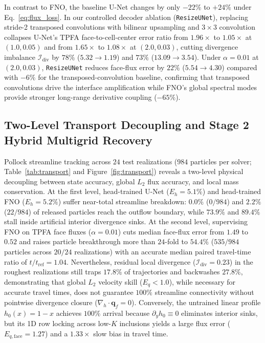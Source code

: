 \documentclass[preprint,12pt,authoryear]{elsarticle}
\begin{document}
In contrast to FNO, the baseline U-Net changes by only $-22\%$ to $+24\%$ under Eq.~\eqref{eq:flux_loss}. In our controlled decoder ablation (\texttt{ResizeUNet}), replacing stride-2 transposed convolutions with bilinear upsampling and $3 \times 3$ convolution collapses U-Net's TPFA face-to-cell-center error ratio from $1.96\times$ to $1.05\times$ at $(1.0, 0.05)$ and from $1.65\times$ to $1.08\times$ at $(2.0, 0.03)$, cutting divergence imbalance $\mathcal{I}_{\text{div}}$ by $78\%$ ($5.32 \to 1.19$) and $73\%$ ($13.09 \to 3.54$). Under $\alpha = 0.01$ at $(2.0, 0.03)$, \texttt{ResizeUNet} reduces face-flux error by $22\%$ ($5.54 \to 4.30$) compared with $-6\%$ for the transposed-convolution baseline, confirming that transposed convolutions drive the interface amplification while FNO's global spectral modes provide stronger long-range derivative coupling ($-65\%$).

\subsection{Two-Level Transport Decoupling and Stage 2 Hybrid Multigrid Recovery}
\label{sec:transport_results}

Pollock streamline tracking across $24$ test realizations ($984$ particles per solver; Table~\ref{tab:transport} and Figure~\ref{fig:transport}) reveals a two-level physical decoupling between state accuracy, global $L_2$ flux accuracy, and local mass conservation. At the first level, head-trained U-Net ($E_h = 5.1\%$) and head-trained FNO ($E_h = 5.2\%$) suffer near-total streamline breakdown: $0.0\%$ ($0/984$) and $2.2\%$ ($22/984$) of released particles reach the outflow boundary, while $73.9\%$ and $89.4\%$ stall inside artificial interior divergence sinks. At the second level, supervising FNO on TPFA face fluxes ($\alpha = 0.01$) cuts median face-flux error from $1.49$ to $0.52$ and raises particle breakthrough more than $24$-fold to $54.4\%$ ($535/984$ particles across $20/24$ realizations) with an accurate median paired travel-time ratio of $t / t_{\text{ref}} = 1.04$. Nevertheless, residual local divergence ($\mathcal{I}_{\text{div}} = 0.23$) in the roughest realizations still traps $17.8\%$ of trajectories and backwashes $27.8\%$, demonstrating that global $L_2$ velocity skill ($E_q < 1.0$), while necessary for accurate travel times, does not guarantee $100\%$ streamline connectivity without pointwise divergence closure ($\nabla_h \cdot \mathbf{q}_f = 0$). Conversely, the untrained linear profile $h_0(x) = 1 - x$ achieves $100\%$ arrival because $\partial_y h_0 \equiv 0$ eliminates interior sinks, but its 1D row locking across low-$K$ inclusions yields a large flux error ($E_{q,\text{face}} = 1.27$) and a $1.33\times$ slow bias in travel time.
\end{document}

